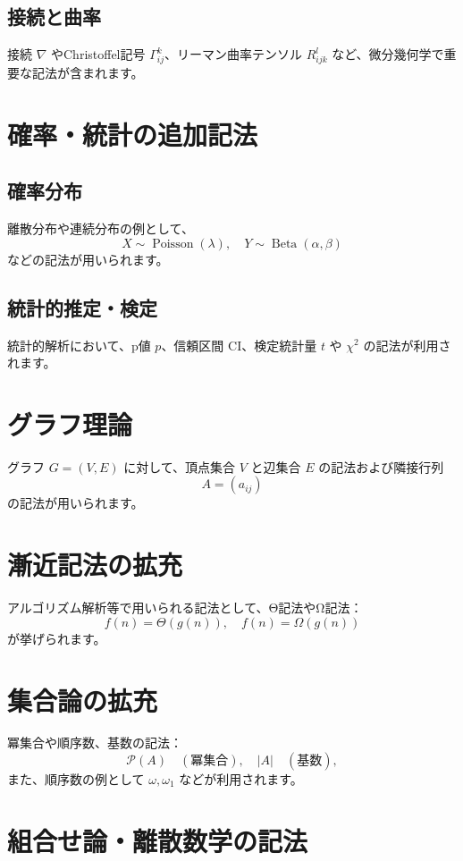 \documentclass{ltjsarticle} %
\begin{document}
\subsection{接続と曲率}
接続 \( \nabla \) やChristoffel記号 \( \Gamma_{ij}^k \)、リーマン曲率テンソル \( R^l_{ijk} \) など、微分幾何学で重要な記法が含まれます。

\section{確率・統計の追加記法}
\subsection{確率分布}
離散分布や連続分布の例として、
\[
  X \sim \operatorname{Poisson}(\lambda), \quad Y \sim \operatorname{Beta}(\alpha,\beta)
\]
などの記法が用いられます。

\subsection{統計的推定・検定}
統計的解析において、p値 \( p \)、信頼区間 \( \mathrm{CI} \)、検定統計量 \( t \) や \( \chi^2 \) の記法が利用されます。

\section{グラフ理論}
グラフ \( G=(V,E) \) に対して、頂点集合 \( V \) と辺集合 \( E \) の記法および隣接行列
\[
  A = (a_{ij})
\]
の記法が用いられます。

\section{漸近記法の拡充}
アルゴリズム解析等で用いられる記法として、Θ記法やΩ記法：
\[
  f(n) = \Theta(g(n)), \quad f(n) = \Omega(g(n))
\]
が挙げられます。

\section{集合論の拡充}
冪集合や順序数、基数の記法：
\[
  \mathcal{P}(A) \quad (\text{冪集合}), \quad |A| \quad (\text{基数}),
\]
また、順序数の例として \( \omega, \omega_1 \) などが利用されます。


\section{組合せ論・離散数学の記法}
\end{document}
